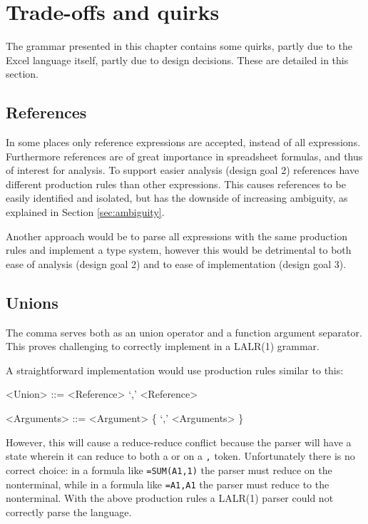 
\section{Trade-offs and quirks}

The grammar presented in this chapter contains some quirks, partly due to the Excel language itself, partly due to design decisions.
These are detailed in this section.

\subsection{References}
\label{tradeoff:references}

In some places only reference expressions are accepted, instead of all expressions.
Furthermore references are of great importance in spreadsheet formulas, and thus of interest for analysis.
To support easier analysis (design goal 2) references have different production rules than other expressions.
This causes references to be easily identified and isolated, but has the downside of increasing ambiguity, as explained in Section \ref{sec:ambiguity}. 

Another approach would be to parse all expressions with the same production rules and implement a type system, however this would be detrimental to both ease of analysis (design goal 2) and to ease of implementation (design goal 3).

\subsection{Unions}
\label{subsec:desing:unions}

The comma serves both as an union operator and a function argument separator.
This proves challenging to correctly implement in a LALR(1) grammar.

A straightforward implementation would use production rules similar to this:
\begin{grammar}
<Union> ::= <Reference> `,' <Reference>

<Arguments> ::= <Argument> \{ `,' <Arguments> \}
\end{grammar}

However, this will cause a reduce-reduce conflict because the parser will have a state wherein it can reduce to both a  or  on a \texttt{,} token.
Unfortunately there is no correct choice: in a formula like \texttt{=SUM(A1,1)} the parser must reduce on the  nonterminal, while in a formula like \texttt{=A1,A1} the parser must reduce to the  nonterminal.
With the above production rules a LALR(1) parser could not correctly parse the language.

